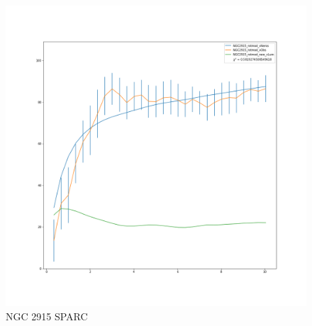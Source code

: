 \documentclass[reprint,%
 amsmath,amssymb,
 aps,
]{revtex4-1}
\begin{document}
 
\begin{figure} 
\centering
\begin{minipage}{0.5\textwidth}
\includegraphics[width=0.8\linewidth]{figures/NGC2915_rotmod_XueSofue.png}
\caption{NGC 2915 SPARC\cite{2016Lelli}}
\label{fig:2915}
\end{minipage}
\end{figure}
%
%  
\end{document}
